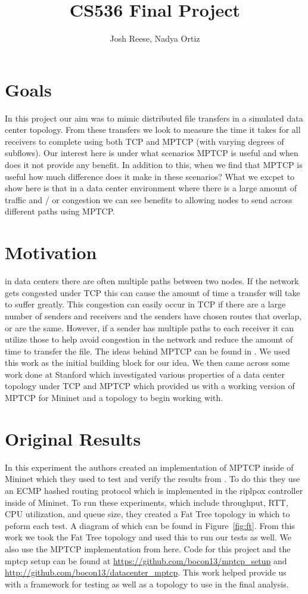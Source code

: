 \documentclass[10pt]{report}
\title{CS536 Final Project}
\author{Josh Reese, Nadya Ortiz}
\begin{document}
\maketitle

\section{Goals}
In this project our aim was to mimic distributed file transfers in
a simulated data center topology. From these transfers we look to
measure the time it takes for all receivers to complete using both TCP
and MPTCP (with varying degrees of subflows). Our interest here is
under what scenarios MPTCP is useful and when does it not provide any
benefit. In addition to this, when we find that MPTCP is useful how
much difference does it make in these scenarios? What we excpet to show
here is that in a data center environment where there is a large
amount of traffic and / or congestion we can see benefits to
allowing nodes to send across different paths using MPTCP. 

\section{Motivation}
in data centers there are often multiple paths between two nodes. If
the network gets congested under TCP this can cause the amount of time
a transfer will take to suffer greatly. This congestion can easily
occur in TCP if there are a large number of senders and receivers and
the senders have chosen routes that overlap, or are the
same. However, if a sender has multiple paths to each receiver it can
utilize those to help avoid congestion
in the network and reduce the amount of time to transfer the file. The
ideas behind MPTCP can be found in \cite{mptcp}. We used this work as
the initial building block for our idea. We then came across some work
done at Stanford which investigated various properties of a data
center topology under TCP and MPTCP \cite{datacenter} which provided
us with a working version of MPTCP for Mininet and a topology to begin
working with. 

\section{Original Results}
\label{sec:oresults}
In this experiment \cite{datacenter} the authors created an
implementation of MPTCP
inside of Mininet which they used to test and verify the results from
\cite{mptcp}. To do this they use an ECMP hashed routing protocol which
is implemented in the riplpox controller inside of Mininet. To run these
experiments, which include throughput, RTT, CPU utilization, and queue size,
they created a Fat Tree topology in which to peform each test. A diagram of
which can be found in Figure~\ref{fig:ft}. From this work we
took the Fat Tree topology and used this to run our tests as well. We
also use the MPTCP implementation from here. Code for this project and
the mptcp setup can be found at
\url{https://github.com/bocon13/mptcp_setup} and 
\url{http://github.com/bocon13/datacenter_mptcp}. This work helped
provide us with a framework for testing as well as a topology to use
in the final analysis.
\end{document}
